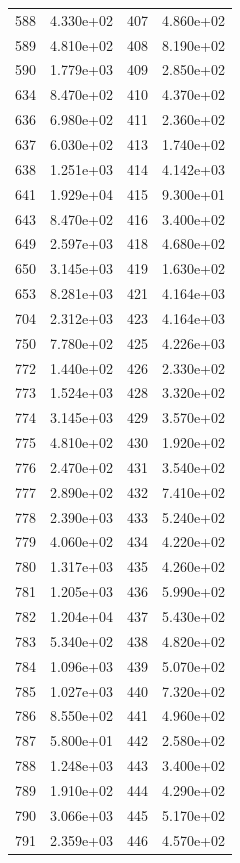 \documentclass[12pt]{article}
\begin{document}
\begin{longtable}{@{}cccc@{}}
588 & 4.330e+02 & 407 & 4.860e+02 \\
589 & 4.810e+02 & 408 & 8.190e+02 \\
590 & 1.779e+03 & 409 & 2.850e+02 \\
634 & 8.470e+02 & 410 & 4.370e+02 \\
636 & 6.980e+02 & 411 & 2.360e+02 \\
637 & 6.030e+02 & 413 & 1.740e+02 \\
638 & 1.251e+03 & 414 & 4.142e+03 \\
641 & 1.929e+04 & 415 & 9.300e+01 \\
643 & 8.470e+02 & 416 & 3.400e+02 \\
649 & 2.597e+03 & 418 & 4.680e+02 \\
650 & 3.145e+03 & 419 & 1.630e+02 \\
653 & 8.281e+03 & 421 & 4.164e+03 \\
704 & 2.312e+03 & 423 & 4.164e+03 \\
750 & 7.780e+02 & 425 & 4.226e+03 \\
772 & 1.440e+02 & 426 & 2.330e+02 \\
773 & 1.524e+03 & 428 & 3.320e+02 \\
774 & 3.145e+03 & 429 & 3.570e+02 \\
775 & 4.810e+02 & 430 & 1.920e+02 \\
776 & 2.470e+02 & 431 & 3.540e+02 \\
777 & 2.890e+02 & 432 & 7.410e+02 \\
778 & 2.390e+03 & 433 & 5.240e+02 \\
779 & 4.060e+02 & 434 & 4.220e+02 \\
780 & 1.317e+03 & 435 & 4.260e+02 \\
781 & 1.205e+03 & 436 & 5.990e+02 \\
782 & 1.204e+04 & 437 & 5.430e+02 \\
783 & 5.340e+02 & 438 & 4.820e+02 \\
784 & 1.096e+03 & 439 & 5.070e+02 \\
785 & 1.027e+03 & 440 & 7.320e+02 \\
786 & 8.550e+02 & 441 & 4.960e+02 \\
787 & 5.800e+01 & 442 & 2.580e+02 \\
788 & 1.248e+03 & 443 & 3.400e+02 \\
789 & 1.910e+02 & 444 & 4.290e+02 \\
790 & 3.066e+03 & 445 & 5.170e+02 \\
791 & 2.359e+03 & 446 & 4.570e+02 \\

\end{longtable}
\end{document}
